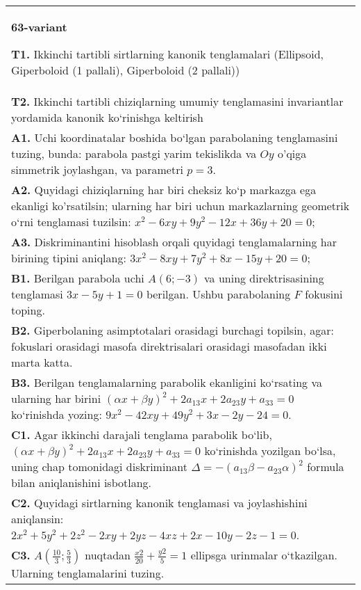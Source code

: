 \documentclass{article}
\begin{document}
\begin{tabular}{m{17cm}}
\textbf{63-variant}
\newline

\textbf{T1.} Ikkinchi tartibli sirtlarning kanonik tenglamalari (Ellipsoid, Giperboloid (1 pallali), Giperboloid (2 pallali)) \\
\textbf{T2.} Ikkinchi tartibli chiziqlarning umumiy tenglamasini invariantlar yordamida kanonik ko‘rinishga keltirish \\
\textbf{A1.} Uchi koordinatalar boshida bo‘lgan parabolaning tenglamasini tuzing, bunda: parabola pastgi yarim tekislikda va $Oy$ o'qiga simmetrik joylashgan, va parametri $p=3$. \\
\textbf{A2.} Quyidagi chiziqlarning har biri cheksiz ko‘p markazga ega ekanligi ko'rsatilsin; ularning har biri uchun markazlarning geometrik o‘rni tenglamasi tuzilsin: $x^2-6 x y+9 y^2-12 x+36 y+20=0$; \\
\textbf{A3.} Diskriminantini hisoblash orqali quyidagi tenglamalarning har birining tipini aniqlang: $3 x^2-8 x y+7 y^2+8 x-15 y+20=0$; \\
\textbf{B1.} Berilgan parabola uchi $A(6;-3)$ va uning direktrisasining tenglamasi $3x-5y+1=0$ berilgan. Ushbu parabolaning $F$ fokusini toping. \\
\textbf{B2.} Giperbolaning asimptotalari orasidagi burchagi topilsin, agar: fokuslari orasidagi masofa direktrisalari orasidagi masofadan ikki marta katta. \\
\textbf{B3.} Berilgan tenglamalarning parabolik ekanligini ko‘rsating va ularning har birini $(\alpha x+\beta y)^2+2 a_{13} x+2 a_{23} y+a_{33}=0$ ko‘rinishda yozing: $9 x^2-42 x y+49 y^2+3 x-2 y-24=0$. \\
\textbf{C1.} Agar ikkinchi darajali tenglama parabolik bo‘lib, $ (\alpha x+\beta y) ^2+2a_{13}x+2a_{23}y+a_{33}=0$ ko‘rinishda yozilgan bo‘lsa, uning chap tomonidagi diskriminant $\Delta=- (a_{13} \beta-a_{23} \alpha) ^2$ formula bilan aniqlanishini isbotlang. \\
\textbf{C2.} Quyidagi sirtlarning kanonik tenglamasi va joylashishini aniqlansin: $2 x^2+5 y^2+2 z^2-2 x y+2 y z-4 x z+2 x-10 y-2 z-1=0$. \\
\textbf{C3.} $A\left(\frac{10}{3}; \frac{5}{3}\right)$ nuqtadan $\frac{x2}{20}+\frac{y2}{5}=1$ ellipsga urinmalar o‘tkazilgan. Ularning tenglamalarini tuzing. \\

\end{tabular}
\vspace{1cm}
\end{document}
